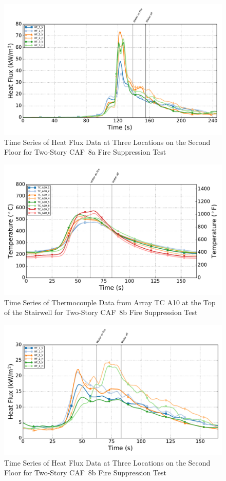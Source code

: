 \documentclass[12pt,oneside]{book}
\begin{document}
\begin{figure}[!ht]
	\includegraphics[width=.85\columnwidth]{../Figures/Script_Figures/Test_40a_West_061415_Heat_Flux}
	\caption{Time Series of Heat Flux Data at Three Locations on the Second Floor for Two-Story CAF~8a Fire Suppression Test}
	\label{fig:app_caf8a_hf}
\end{figure}

\begin{figure}[!ht]
	\includegraphics[width=.85\columnwidth]{../Figures/Script_Figures/Test_40b_West_061415_TC_A10}
	\caption{Time Series of Thermocouple Data from Array TC A10 at the Top of the Stairwell for Two-Story CAF~8b Fire Suppression Test}
	\label{fig:app_caf8b_tca10}
\end{figure}

\begin{figure}[!ht]
	\includegraphics[width=.85\columnwidth]{../Figures/Script_Figures/Test_40b_West_061415_Heat_Flux}
	\caption{Time Series of Heat Flux Data at Three Locations on the Second Floor for Two-Story CAF~8b Fire Suppression Test}
	\label{fig:app_caf8b_hf}
\end{figure}
\end{document}
